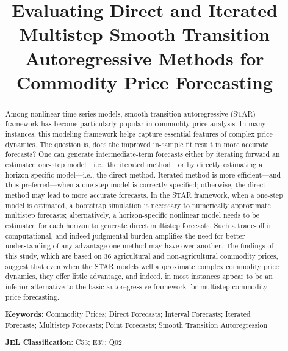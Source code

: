 \documentclass[11pt]{article}
\title{Evaluating Direct and Iterated Multistep Smooth Transition Autoregressive Methods for Commodity Price Forecasting}
\date{}
\begin{document}
\begin{titlepage}
	
	\maketitle
	\thispagestyle{empty}
	\onehalfspacing
	
	\begin{abstract}
		
		\noindent Among nonlinear time series models, smooth transition autoregressive (STAR) framework has become particularly popular in commodity price analysis. In many instances, this modeling framework helps capture essential features of complex price dynamics. The question is, does the improved in-sample fit result in more accurate forecasts? One can generate intermediate-term forecasts either by iterating forward an estimated one-step model---i.e., the iterated method---or by directly estimating a horizon-specific model---i.e., the direct method. Iterated method is more efficient---and thus preferred---when a one-step model is correctly specified; otherwise, the direct method may lead to more accurate forecasts. In the STAR framework, when a one-step model is estimated, a bootstrap simulation is necessary to numerically approximate multistep forecasts; alternatively, a horizon-specific nonlinear model needs to be estimated for each horizon to generate direct multistep forecasts. Such a trade-off in computational, and indeed judgmental burden amplifies the need for better understanding of any advantage one method may have over another. The findings of this study, which are based on 36 agricultural and non-agricultural commodity prices, suggest that even when the STAR models well approximate complex commodity price dynamics, they offer little advantage, and indeed, in most instances appear to be an inferior alternative to the basic autoregressive framework for multistep commodity price forecasting. 
		
		\medskip
		
		\noindent\textbf{Keywords}: Commodity Prices; Direct Forecasts; Interval Forecasts; Iterated Forecasts; Multistep Forecasts; Point Forecasts; Smooth Transition Autoregression
		
		\medskip
		
		\noindent\textbf{JEL Classification}: C53; E37; Q02
		
	\end{abstract}

\end{titlepage}
\end{document}
